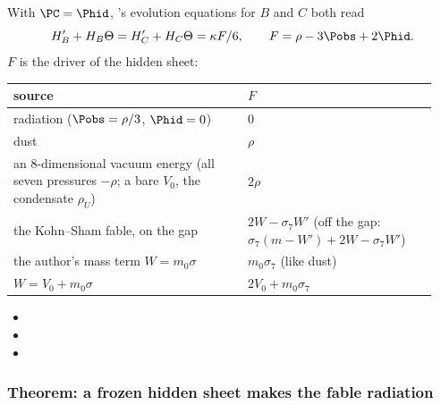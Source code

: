 With $\PC=\Phid$, 's evolution equations for $B$ and $C$ both read
\[
  H_B'+H_B\Theta=H_C'+H_C\Theta=\kappa F/6,\qquad F=\rho-3\Pobs+2\Phid .
\]
$F$ is the driver of the hidden sheet:
\begin{center}
\small
\renewcommand{\arraystretch}{1.3}
\begin{tabular}{@{}>{\raggedright\arraybackslash}p{0.52\linewidth}>{\raggedright\arraybackslash}p{0.42\linewidth}@{}}
\toprule
source & $F$\\
\midrule
radiation ($\Pobs=\rho/3$, $\Phid=0$) & $0$\\
dust & $\rho$\\
an 8-dimensional vacuum energy (all seven pressures $-\rho$; a bare $V_0$, the condensate $\rho_U$) & $2\rho$\\
the Kohn--Sham fable, on the gap & $2W-\sigma_7W'$ (off the gap: $\sigma_7(m-W')+2W-\sigma_7W'$)\\
the author's mass term $W=m_0\sigma$ & $m_0\sigma_7$ (like dust)\\
$W=V_0+m_0\sigma$ & $2V_0+m_0\sigma_7$\\
\bottomrule
\end{tabular}
\end{center}
\begin{itemize}
  \item {}
  \item {}
  \item {}
\end{itemize}

\subsubsection{Theorem: a frozen hidden sheet makes the fable radiation}
\label{sec:4.5.7}

